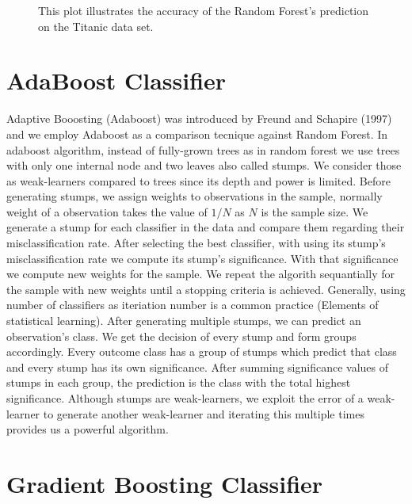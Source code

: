 \begin{figure}[H]
    \captionsetup{format=plain}
    \caption
        {This plot illustrates the accuracy of the Random Forest's prediction on the Titanic data set.
        }
    \label{fig:confusion_matrix}
\end{figure}



\section{AdaBoost Classifier}
\label{sec:adaboost}
Adaptive Booosting (Adaboost) was introduced by Freund and Schapire (1997) and we employ Adaboost as a comparison tecnique against Random Forest. In adaboost algorithm, instead of fully-grown trees as in random forest  we use trees with only one internal node and two leaves also called stumps. We consider those as weak-learners compared to trees since its depth and power is limited. Before generating stumps, we assign weights to observations in the sample, normally weight of a observation takes the value of $1/N$ as $N$ is the sample size. We generate a stump for each classifier in the data and compare them regarding their misclassification rate. After selecting the best classifier, with using its stump's misclassification rate we compute its stump's significance. With that significance we compute new weights for the sample. We repeat the algorith sequantially for the sample with new weights until a stopping criteria is achieved. Generally, using number of classifiers as iteriation number is a common practice (Elements of statistical learning). After generating multiple stumps, we can predict an observation's class. We get the decision of every stump and form groups accordingly. Every outcome class has a group of stumps which predict that class and every stump has its own significance. After summing significance values of stumps in each group, the prediction is the class with the total highest significance. Although stumps are weak-learners, we exploit the error of a weak-learner to generate another weak-learner and iterating this multiple times provides us a powerful algorithm.

\section{Gradient Boosting Classifier}
\label{sec:gradient_boosting}
